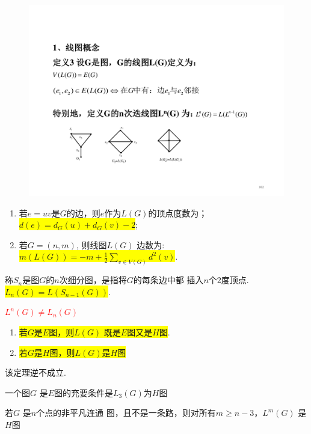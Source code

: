 \begin{figure}[H]
	\small
	\centering 
	\includegraphics[scale=0.8]{image/CH4_LG.pdf}  
	\label{figkjjj1KKik}  
\end{figure}

\noindent {\bfseries \textcolor{ecolor}{线图的性质：}}

\begin{enumerate}
	\item 若$e=uv$是$G$的边，则$e$作为$L(G)$的顶点度数为；\colorbox{yellow}{$d(e) = d_G(u)+d_G(v)-2$};
	\item 若$G=(n, m)$, 则线图$L(G)$ 边数为:\colorbox{yellow}{$m(L(G))=-m+\frac{1}{2}\sum\limits_{v\in V(G)}d^2(v)$}.
\end{enumerate}


\begin{definition}
	称$S_n$是图$G$的$n$次细分图，是指将$G$的每条边中都
	插入$n$个$2$度顶点.\colorbox{yellow}{$L_n(G)=L(S_{n-1}(G))$}.
\end{definition}
\begin{note}
	\textcolor{red}{$L^{n}(G)\ne L_n(G)$}
\end{note}

\begin{theorem}
	\begin{enumerate}
	\item \colorbox{yellow}{若$G$是$E$图，则$L(G)$ 既是$E$图又是$H$图}.
	\item  \colorbox{yellow}{若$G$是$H$图，则$L(G)$是$H$图}
\end{enumerate}
\end{theorem}
\begin{note}
	该定理逆不成立.
\end{note}
\begin{theorem}
一个图$G$ 是$E$图的充要条件是$L_3(G)$为$H$图
\end{theorem}
\begin{theorem}[Chartarand]
若$G$ 是$n$个点的非平凡连通
图，且不是一条路，则对所有$m\geq n-3$，$L^m(G)$ 是$H$图
\end{theorem}









